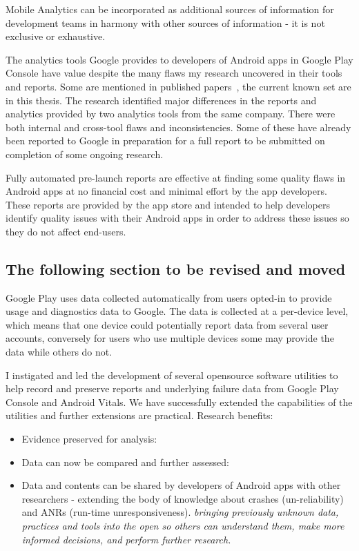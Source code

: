Mobile Analytics can be incorporated as additional sources of information for development teams in harmony with other sources of information - it is not exclusive or exhaustive.

The analytics tools Google provides to developers of Android apps in Google Play Console have value despite the many flaws my research uncovered in their tools and reports. Some are mentioned in published papers~\cite{harty_google_play_console_insightful_development_using_android_vitals_and_pre_launch_reports, harty_better_android_apps_using_android_vitals, harty_improving_app_quality_despite_flawed_mobile_analytics}, the current known set are in this thesis. The research identified major differences in the reports and analytics provided by two analytics tools from the same company. There were both internal and cross-tool flaws and inconsistencies. Some of these have already been reported to Google in preparation for a full report to be submitted on completion of some ongoing research.

Fully automated pre-launch reports are effective at finding some quality flaws in Android apps at no financial cost and minimal effort by the app developers. These reports are provided by the app store and intended to help developers identify quality issues with their Android apps in order to address these issues so they do not affect end-users.

\subsection{The following section to be revised and moved}

 

Google Play uses data collected automatically from users opted-in to provide usage and diagnostics data to Google. The data is collected at a per-device level, which means that one device could potentially report data from several user accounts, conversely for users who use multiple devices some may provide the data while others do not.


I instigated and led the development of several opensource software utilities to help record and preserve reports and underlying failure data from Google Play Console and Android Vitals. We have successfully extended the capabilities of the utilities and further extensions are practical. Research benefits:
\begin{itemize}
    \item Evidence preserved for analysis:
    \item Data can now be compared and further assessed:
    \item Data and contents can be shared by developers of Android apps with other researchers - extending the body of knowledge about crashes (un-reliability) and ANRs (run-time unresponsiveness). \emph{bringing previously unknown data, practices and tools into the open so others can understand them, make more informed decisions, and perform further research.}
\end{itemize}

